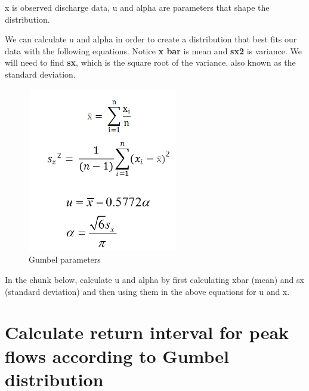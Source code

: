 \documentclass[
]{book}
\newenvironment{Shaded}{\begin{snugshade}}{\end{snugshade}}
\newcommand{\DecValTok}[1]{\textcolor[rgb]{0.00,0.00,0.81}{#1}}
\newcommand{\FloatTok}[1]{\textcolor[rgb]{0.00,0.00,0.81}{#1}}
\newcommand{\FunctionTok}[1]{\textcolor[rgb]{0.00,0.00,0.00}{#1}}
\newcommand{\NormalTok}[1]{#1}
\newcommand{\OtherTok}[1]{\textcolor[rgb]{0.56,0.35,0.01}{#1}}
\newcommand{\SpecialCharTok}[1]{\textcolor[rgb]{0.00,0.00,0.00}{#1}}
\begin{document}
x is observed discharge data, u and alpha are parameters that shape the distribution.

We can calculate u and alpha in order to create a distribution that best fits our data with the following equations. Notice \textbf{x bar} is mean and \textbf{sx2} is variance. We will need to find \textbf{sx}, which is the square root of the variance, also known as the standard deviation.

\begin{figure}
\centering
\includegraphics[width=2.58333in,height=\textheight]{images/gumbelparams.png}
\caption{Gumbel parameters}
\end{figure}

In the chunk below, calculate u and alpha by first calculating xbar (mean) and sx (standard deviation) and then using them in the above equations for u and x.

\begin{Shaded}
\end{Shaded}

\hypertarget{calculate-return-interval-for-peak-flows-according-to-gumbel-distribution}{%
\section{Calculate return interval for peak flows according to Gumbel distribution}\label{calculate-return-interval-for-peak-flows-according-to-gumbel-distribution}}
\end{document}
